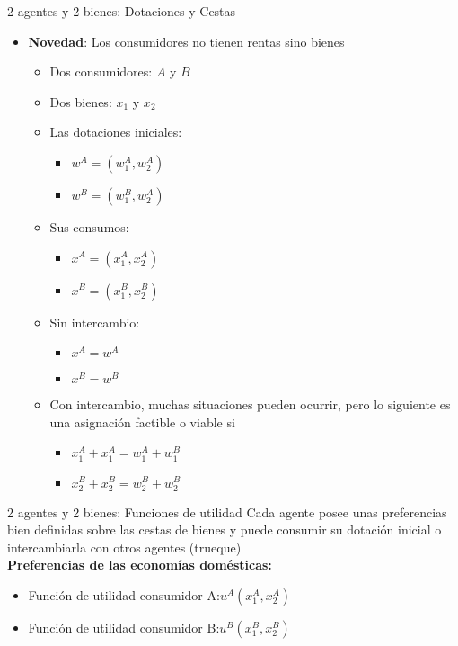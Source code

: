 \begin{frame}{2 agentes y 2 bienes: Dotaciones y Cestas}
	\begin{itemize}
		\item \textbf{Novedad}: Los consumidores no tienen rentas sino bienes
			\begin{itemize}
				\item Dos consumidores: $A$ y $B$
				\item Dos bienes: $x_1$ y $x_2$
				\item Las dotaciones iniciales:
					\begin{itemize}
						\item $w^{A}=(w_{1}^{A},w_{2}^{A})$
						\item $w^{B}=(w_{1}^{B},w_{2}^{A})$
					\end{itemize}
				\item Sus consumos:
					\begin{itemize}
						\item $x^{A}=(x_{1}^{A},x_{2}^{A})$
						\item $x^{B}=(x_{1}^{B},x_{2}^{B})$
					\end{itemize}
				\item Sin intercambio:
					\begin{itemize}
						\item $x^{A}=w^{A}$
						\item $x^{B}=w^{B}$
					\end{itemize}
				\item Con intercambio, muchas situaciones pueden ocurrir, pero lo siguiente es una asignación factible o viable si
					\begin{itemize}
						\item $x_{1}^{A}+x_{1}^{A}=w_{1}^{A}+w_{1}^{B}$
						\item $x_{2}^{B}+x_{2}^{B}=w_{2}^{B}+w_{2}^{B}$
					\end{itemize}				
			\end{itemize}
	\end{itemize}
\end{frame}
\begin{frame}{2 agentes y 2 bienes: Funciones de utilidad}
Cada agente posee unas preferencias bien definidas sobre las cestas de bienes y puede consumir su dotación inicial o intercambiarla con otros agentes (trueque)\\
	\bigskip
\textbf{Preferencias de las economías domésticas:}
	\begin{itemize}
		\item Función de utilidad consumidor A:\quad $u^{A}(x_{1}^{A},x_{2}^{A})$
		\item Función de utilidad consumidor B:\quad $u^{B}(x_{1}^{B},x_{2}^{B})$
	\end{itemize}
\end{frame}

